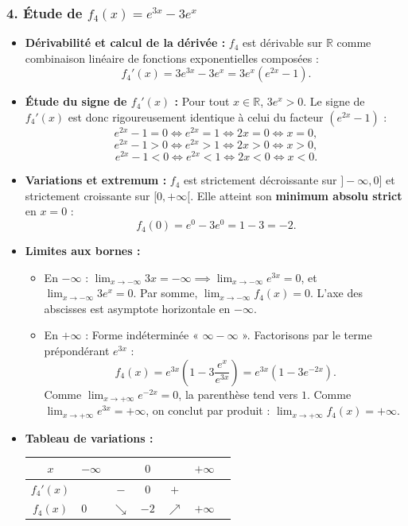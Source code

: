 \documentclass[11pt,a4paper]{article}
\newcommand{\R}{\mathbb{R}}
\begin{document}
\begin{correctionbox}[Exercice 3]
\subsubsection*{4. Étude de $f_4(x) = e^{3x} - 3e^x$}
\begin{itemize}
    \item \textbf{Dérivabilité et calcul de la dérivée :}
    $f_4$ est dérivable sur $\R$ comme combinaison linéaire de fonctions exponentielles composées :
    \[
    f_4'(x) = 3e^{3x} - 3e^x = 3e^x (e^{2x} - 1).
    \]
    \item \textbf{Étude du signe de $f_4'(x)$ :}
    Pour tout $x \in \R$, $3e^x > 0$. Le signe de $f_4'(x)$ est donc rigoureusement identique à celui du facteur $(e^{2x} - 1)$ :
    \[
    e^{2x} - 1 = 0 \iff e^{2x} = 1 \iff 2x = 0 \iff x = 0,
    \]
    \[
    e^{2x} - 1 > 0 \iff e^{2x} > 1 \iff 2x > 0 \iff x > 0,
    \]
    \[
    e^{2x} - 1 < 0 \iff e^{2x} < 1 \iff 2x < 0 \iff x < 0.
    \]
    \item \textbf{Variations et extremum :}
    $f_4$ est strictement décroissante sur $]-\infty, 0]$ et strictement croissante sur $[0, +\infty[$.
    Elle atteint son \textbf{minimum absolu strict} en $x = 0$ :
    \[
    f_4(0) = e^0 - 3e^0 = 1 - 3 = -2.
    \]
    \item \textbf{Limites aux bornes :}
    \begin{itemize}
        \item En $-\infty$ : $\lim_{x \to -\infty} 3x = -\infty \implies \lim_{x \to -\infty} e^{3x} = 0$, et $\lim_{x \to -\infty} 3e^x = 0$. Par somme, $\lim_{x \to -\infty} f_4(x) = 0$.
        L'axe des abscisses est asymptote horizontale en $-\infty$.
        \item En $+\infty$ : Forme indéterminée « $\infty - \infty$ ». Factorisons par le terme prépondérant $e^{3x}$ :
        \[
        f_4(x) = e^{3x}\left(1 - 3\frac{e^x}{e^{3x}}\right) = e^{3x}(1 - 3e^{-2x}).
        \]
        Comme $\lim_{x \to +\infty} e^{-2x} = 0$, la parenthèse tend vers $1$. Comme $\lim_{x \to +\infty} e^{3x} = +\infty$, on conclut par produit : $\lim_{x \to +\infty} f_4(x) = +\infty$.
    \end{itemize}
    \item \textbf{Tableau de variations :}
    \begin{center}
    \begin{tabular}{|c|lccccr|}
    \hline
    $x$ & $-\infty$ & & $0$ & & $+\infty$ \\
    \hline
    $f_4'(x)$ & & $-$ & $0$ & $+$ & \\
    \hline
    $f_4(x)$ & $0$ & $\searrow$ & $-2$ & $\nearrow$ & $+\infty$ \\
    \hline
    \end{tabular}
    \end{center}
\end{itemize}


\end{correctionbox}
\end{document}
